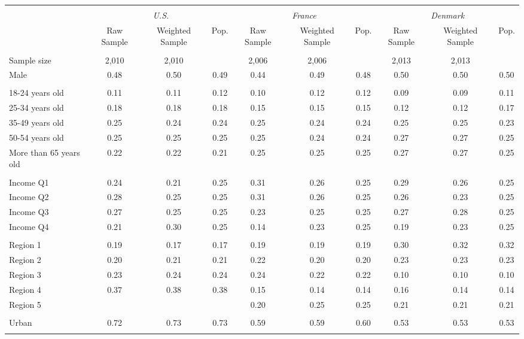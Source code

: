\begin{tabular}{lccccccccc}
\toprule
\hline \\[-1.8ex]
\multicolumn{1}{c}{\em{ }} & \multicolumn{3}{c}{\em{U.S.}} & \multicolumn{3}{c}{\em{France}} & \multicolumn{3}{c}{\em{Denmark}}\\
\cmidrule(l{3pt}r{3pt}){2-4} \cmidrule(l{3pt}r{3pt}){5-7} \cmidrule(l{3pt}r{3pt}){8-10}
\noalign{\smallskip}  & Raw Sample & Weighted Sample & Pop. & Raw Sample & Weighted Sample & Pop. & Raw Sample & Weighted Sample & Pop. \\
\hline \\[-1.8ex] 
Sample size & 2,010 & 2,010 & & 2,006 & 2,006 &  & 2,013 & 2,013 & \\
\noalign{\smallskip}\hline \noalign{\smallskip}Male & 0.48 & 0.50 & 0.49 & 0.44 & 0.49 & 0.48 & 0.50 & 0.50 & 0.50\\ 
\\
18-24 years old & 0.11 & 0.11 & 0.12 & 0.10 & 0.12 & 0.12 & 0.09 & 0.09 & 0.11\\
25-34 years old & 0.18 & 0.18 & 0.18 & 0.15 & 0.15 & 0.15 & 0.12 & 0.12 & 0.17\\
35-49 years old & 0.25 & 0.24 & 0.24 & 0.25 & 0.24 & 0.24 & 0.25 & 0.25 & 0.23\\
50-54 years old & 0.25 & 0.25 & 0.25 & 0.25 & 0.24 & 0.24 & 0.27 & 0.27 & 0.25\\
More than 65 years old & 0.22 & 0.22 & 0.21 & 0.25 & 0.25 & 0.25 & 0.27 & 0.27 & 0.25\\ 
\\
Income Q1 & 0.24 & 0.21 & 0.25 & 0.31 & 0.26 & 0.25 & 0.29 & 0.26 & 0.25\\
Income Q2 & 0.28 & 0.25 & 0.25 & 0.31 & 0.26 & 0.25 & 0.26 & 0.23 & 0.25\\
Income Q3 & 0.27 & 0.25 & 0.25 & 0.23 & 0.25 & 0.25 & 0.27 & 0.28 & 0.25\\
Income Q4 & 0.21 & 0.30 & 0.25 & 0.14 & 0.23 & 0.25 & 0.19 & 0.23 & 0.25\\
\\
Region 1 & 0.19 & 0.17 & 0.17 & 0.19 & 0.19 & 0.19 & 0.30 & 0.32 & 0.32\\
Region 2 & 0.20 & 0.21 & 0.21 & 0.22 & 0.20 & 0.20 & 0.23 & 0.23 & 0.23\\
Region 3 & 0.23 & 0.24 & 0.24 & 0.24 & 0.22 & 0.22 & 0.10 & 0.10 & 0.10\\
Region 4 & 0.37 & 0.38 & 0.38 & 0.15 & 0.14 & 0.14 & 0.16 & 0.14 & 0.14\\
Region 5 & &  &  & 0.20 & 0.25 & 0.25 & 0.21 & 0.21 & 0.21\\
\\
Urban & 0.72 & 0.73 & 0.73 & 0.59 & 0.59 & 0.60 & 0.53 & 0.53 & 0.53\\
\\
\bottomrule
\end{tabular}